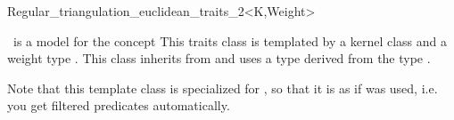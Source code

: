 

\begin{ccRefClass}{Regular_triangulation_euclidean_traits_2<K,Weight>}  %

\ccDefinition
  

 \ccRefName\  is a  model for the concept 
This traits class is templated by a kernel class 
and a weight type .
This class inherits from 
and uses a  type
derived from the type .

Note that this template class is specialized for
, so that it is as if
 was used, i.e. you get
filtered predicates automatically.


\ccIsModel
{}

\ccInheritsFrom
{}


\ccSeeAlso
{}\\
\\


\end{ccRefClass}



